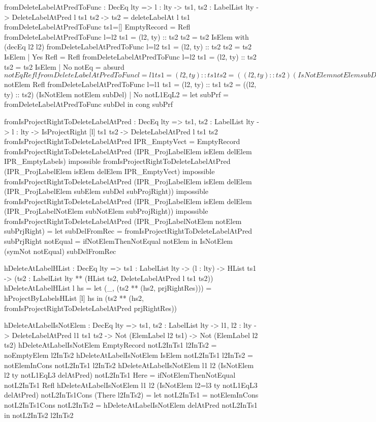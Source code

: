 \begin{code}
fromDeleteLabelAtPredToFunc : DecEq lty => {l : lty} -> 
  {ts1, ts2 : LabelList lty} -> 
  DeleteLabelAtPred l ts1 ts2 -> ts2 = deleteLabelAt l ts1
fromDeleteLabelAtPredToFunc {ts1=[]} EmptyRecord = Refl
fromDeleteLabelAtPredToFunc {l=l2} {ts1 = (l2, ty) :: ts2} 
  {ts2 = ts2} IsElem with (decEq l2 l2)
  fromDeleteLabelAtPredToFunc {l=l2} {ts1 = (l2, ty) :: ts2} 
    {ts2 = ts2} IsElem | Yes Refl = Refl
  fromDeleteLabelAtPredToFunc {l=l2} {ts1 = (l2, ty) :: ts2} 
    {ts2 = ts2} IsElem | No notEq = absurd $ notEq Refl
fromDeleteLabelAtPredToFunc {l=l1} {ts1 = (l2, ty) :: ts1} 
  {ts2 = ((l2, ty) :: ts2)} (IsNotElem notElem subDel) 
  with (decEq l1 l2)
  fromDeleteLabelAtPredToFunc {l=l1} {ts1 = (l1, ty) :: ts1} 
    {ts2 = ((l1, ty) :: ts2)} (IsNotElem notElem subDel) | 
    Yes Refl = 
    absurd $ notElem Refl
  fromDeleteLabelAtPredToFunc {l=l1} {ts1 = (l2, ty) :: ts1} 
    {ts2 = ((l2, ty) :: ts2)} (IsNotElem notElem subDel) | 
    No notL1EqL2 = 
    let subPrf = fromDeleteLabelAtPredToFunc subDel
    in cong subPrf
    
fromIsProjectRightToDeleteLabelAtPred : DecEq lty => 
  {ts1, ts2 : LabelList lty} -> {l : lty} -> 
  IsProjectRight [l] ts1 ts2 -> DeleteLabelAtPred l ts1 ts2
fromIsProjectRightToDeleteLabelAtPred IPR_EmptyVect = EmptyRecord
fromIsProjectRightToDeleteLabelAtPred (IPR_ProjLabelElem 
  isElem delElem IPR_EmptyLabels) impossible
fromIsProjectRightToDeleteLabelAtPred (IPR_ProjLabelElem 
  isElem delElem IPR_EmptyVect) impossible
fromIsProjectRightToDeleteLabelAtPred (IPR_ProjLabelElem 
  isElem delElem (IPR_ProjLabelElem subElem subDel subProjRight)) 
  impossible
fromIsProjectRightToDeleteLabelAtPred (IPR_ProjLabelElem 
  isElem delElem (IPR_ProjLabelNotElem subNotElem subProjRight)) 
  impossible
fromIsProjectRightToDeleteLabelAtPred (IPR_ProjLabelNotElem 
  notElem subPrjRight) = 
  let subDelFromRec = 
        fromIsProjectRightToDeleteLabelAtPred subPrjRight
      notEqual = ifNotElemThenNotEqual notElem
  in IsNotElem (symNot notEqual) subDelFromRec
    
hDeleteAtLabelHList : DecEq lty => {ts1 : LabelList lty} -> 
  (l : lty) -> HList ts1 ->
  (ts2 : LabelList lty ** (HList ts2, DeleteLabelAtPred l ts1 ts2))
hDeleteAtLabelHList l hs =
  let (_, (ts2 ** (hs2, prjRightRes))) = 
        hProjectByLabelsHList [l] hs
  in (ts2 ** (hs2, 
       fromIsProjectRightToDeleteLabelAtPred prjRightRes))
  
hDeleteAtLabelIsNotElem : DecEq lty => 
  {ts1, ts2 : LabelList lty} -> {l1, l2 : lty} -> 
  DeleteLabelAtPred l1 ts1 ts2 ->
  Not (ElemLabel l2 ts1) -> Not (ElemLabel l2 ts2)  
hDeleteAtLabelIsNotElem EmptyRecord notL2InTs1 l2InTs2 = 
  noEmptyElem l2InTs2
hDeleteAtLabelIsNotElem IsElem notL2InTs1 l2InTs2 = 
  notElemInCons notL2InTs1 l2InTs2
hDeleteAtLabelIsNotElem {l1} {l2} (IsNotElem {l2} {ty} 
  notL1EqL3 delAtPred) notL2InTs1 Here =  
  ifNotElemThenNotEqual notL2InTs1 Refl
hDeleteAtLabelIsNotElem {l1} {l2} (IsNotElem {l2=l3} {ty} 
  notL1EqL3 delAtPred) notL2InTs1Cons (There l2InTs2) = 
  let notL2InTs1 = notElemInCons notL2InTs1Cons
      notL2InTs2  = hDeleteAtLabelIsNotElem delAtPred notL2InTs1
  in notL2InTs2 l2InTs2
  

\end{code}
